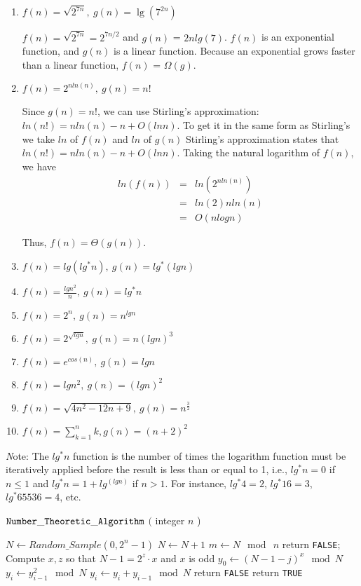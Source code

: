 \documentclass{article}
\begin{document}
\begin{enumerate}
\item $f(n) = \sqrt{2^{7n}},\ g(n) = \lg({7^{2n}})$

$f(n) = \sqrt{2^{7n}} = 2^{7n/2}$ and $g(n)$ = $2n lg(7)$. $f(n)$ is an exponential function, and $g(n)$ is a linear function. Because an exponential grows faster than a linear function, $f(n)$ = $\Omega(g)$. 

\item $f(n) = 2^{nln(n)},\ g(n) = n!$

Since $g(n) = n!$, we can use Stirling's approximation: $ln(n!) = n ln(n) - n + O(ln n)$. To get it in the same form as Stirling's we take $ln$ of $f(n)$ and $ln$ of $g(n)$
Stirling's approximation states that $ln(n!) = n ln(n) - n + O(ln n)$. Taking
the natural logarithm of $f(n)$, we have
\begin{eqnarray*}
    ln(f(n)) &=& ln(2^{n ln(n)}) \\
             &=& ln(2) n ln(n) \\
             &=& O(n log n)
\end{eqnarray*}

Thus, $f(n) = \Theta(g(n))$.

\item $f(n) = lg(lg^*n),\  g(n) = lg^*(lgn)$



\item $f(n) = \frac{lgn^2}{n},\ g(n) = lg^*n$
\item $f(n) = 2^n,\ g(n) = n^{lgn}$
\item $f(n) = 2^{\sqrt{lgn}},\ g(n) = n(lgn)^3$
\item $f(n) = e^{cos(n)},\ g(n) = lgn$
\item $f(n) = lgn^2,\ g(n) = (lgn)^2$
\item $f(n) = \sqrt{4n^2 - 12n + 9},\ g(n) = n^{\frac{3}{2}}$
\item $f(n) = \sum_{k=1}^{n} k, g(n) = (n+2)^2$
\end{enumerate}

{\emph Note:} The $lg^*n$ function is the number of times the
logarithm function must be iteratively applied before the result is
less than or equal to 1, i.e., $lg^*n = 0$ if $n \leq 1$ and $lg^*n =
1 + lg^(lgn)$ if $n > 1$. For instance, $lg^*4=2$, $lg^*16=3$,
$lg^*65536=4$, etc.


\begin{algorithm}[h]
\caption{${\tt Number\_Theoretic\_Algorithm}$ $($ integer $n$ ) }
\label{algo}
$N \leftarrow Random\_Sample( 0, 2^n-1)$\;
{
  $N \leftarrow N + 1$\;
}
$m \leftarrow N \mod\ n$\;
{
  {
    return {\tt FALSE};
  }
  Compute $x,z$ so that $N - 1 = 2^z \cdot x$ and $x$ is odd\;
  $y_0 \leftarrow (N-1-j)^x \mod N$\;
  {
    $y_i \leftarrow y_{i-1}^2 \mod N$\;
    $y_i \leftarrow y_i + y_{i-1} \mod N$\;
  }
  {
    return {\tt FALSE}\;
  }
}
return {\tt TRUE}\;
\end{algorithm}
\end{document}
